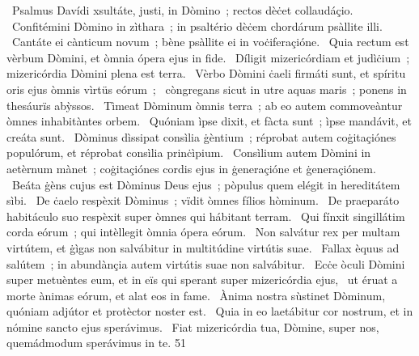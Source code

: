 {~Psalmus Davídi}
{%
xsultáte, justi, in Dòmino~; rectos dèċet collaudáçio.
~Confitémini Dòmino in zìthara~; in psaltério dèċem chordárum psàllite illi.
~Cantáte ei cànticum novum~; bène psàllite ei in voċiferaçióne.
~Quia rectum est vèrbum Dòmini, et òmnia ópera ejus in fide.
~Díligit mizericórdiam et judìċium~; mizericórdia Dòmini plena est terra.
~Vèrbo Dòmini ċaeli firmáti sunt, et spíritu oris ejus òmnis vìrtüs eórum~;
~còngregans sicut in utre aquas maris~; ponens in thesáurïs abỳssos.
~Tìmeat Dòminum òmnis terra~; ab eo autem commoveàntur òmnes inhabitàntes orbem.
~Quóniam ìpse dixit, et fàcta sunt~; ìpse mandávit, et creáta sunt.
~Dòminus dìssipat consìlia ġèntium~; réprobat autem coġitaçiónes populórum, et réprobat consìlia prinċìpium.
~Consìlium autem Dòmini in aetèrnum mànet~; coġitaçiónes cordis ejus in ġeneraçióne et ġeneraçiónem.
~Beáta ġèns cujus est Dòminus Deus ejus~; pòpulus quem elégit in hereditátem sìbi.
~De ċaelo respèxit Dòminus~; vïdit òmnes fílios hòminum.
~De praeparáto habitáculo suo respèxit super òmnes qui hábitant terram.
~Qui fínxit singillátim corda eórum~; qui intèllegit òmnia ópera eórum.
~Non salvátur rex per multam virtútem, et ġìgas non salvábitur in multitúdine virtútis suae.
~Fallax èquus ad salútem~; in abundànçia autem virtútis suae non salvábitur.
~Ecċe òculi Dòmini super metuèntes eum, et in eïs qui sperant super mizericórdia ejus,
~ut éruat a morte ànimas eórum, et alat eos in fame.
~Ànima nostra sùstinet Dòminum, quóniam adjútor et protèctor noster est.
~Quia in eo laetábitur cor nostrum, et in nómine sancto ejus sperávimus.
~Fiat mizericórdia tua, Dòmine, super nos, quemádmodum sperávimus in te.}
{5}{1}

